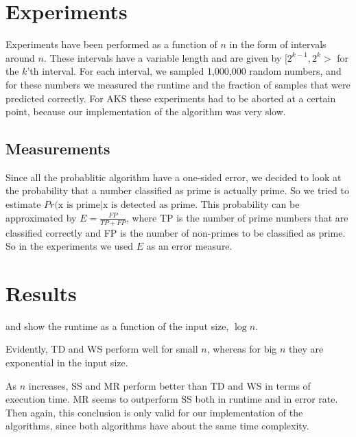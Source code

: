 
\section{Experiments}
\label{sec:experiments}

Experiments have been performed as a function of $n$ in the form of intervals around $n$.
These intervals have a variable length and are given by $[2^{k-1}, 2^k>$ for the $k$'th interval.
For each interval, we sampled 1,000,000 random numbers,
and for these numbers we measured the runtime and the fraction of samples that were predicted correctly.
For AKS these experiments had to be aborted at a certain point, because our implementation of the algorithm was very slow.

\subsection{Measurements}
Since all the probablitic algorithm have a one-sided error, we decided to look at the probability that a number classified as prime is actually prime.
So we tried to estimate $Pr(\text{x is prime} | \text{x is detected as prime}$.
This probability can be approximated by $E = \frac{FP}{TP + FP}$, where TP is the number of prime numbers that are classified correctly and FP is the number of non-primes to be classified as prime.
So in the experiments we used $E$ as an error measure.

\section{Results}
\label{sec:results}

 and  show the runtime as a function of the input size, $\log n$.

Evidently, TD and WS perform well for small $n$, whereas for big $n$ they are exponential in the input size.

As $n$ increases, SS and MR perform better than TD and WS in terms of execution time.
MR seems to outperform SS both in runtime and in error rate.
Then again, this conclusion is only valid for our implementation of the algorithms, since both algorithms have about the same time complexity.


